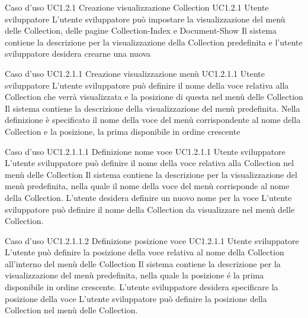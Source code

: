 \UCtitle
{Caso d'uso UC1.2.1}
{Creazione visualizzazione Collection}
\UC
{UC1.2.1}
{Utente sviluppatore}
{L'utente sviluppatore  può impostare la visualizzazione del menù delle Collection, delle pagine Collection-Index e Document-Show}
{Il sistema contiene la descrizione per la visualizzazione della Collection predefinita e l'utente sviluppatore desidera crearne una nuova}

\UCtitle
{Caso d'uso UC1.2.1.1}
{Creazione visualizzazione menù}
\UC
{UC1.2.1.1}
{Utente sviluppatore}
{L'utente sviluppatore può definire il nome della voce relativa alla Collection che verrà visualizzata e la posizione di questa nel menù delle Collection}
{Il sistema contiene la descrizione della visualizzazione del menù predefinita. Nella definizione è specificato il nome della voce del menù corrispondente al nome della Collection e la posizione, la prima disponibile in ordine crescente}

\UCtitle
{Caso d'uso UC1.2.1.1.1}
{Definizione nome voce}
\UC
{UC1.2.1.1}
{Utente sviluppatore}
{L'utente sviluppatore può definire il nome della voce relativa alla Collection nel menù delle Collection}
{Il sistema contiene la descrizione per la visualizzazione del menù predefinita, nella quale il nome della voce del menù corrisponde al nome della Collection. L'utente desidera definire un nuovo nome per la voce}
\scenario
{L'utente sviluppatore può definire il nome della Collection da visualizzare nel menù delle Collection.}

\UCtitle
{Caso d'uso UC1.2.1.1.2}
{Definizione posizione voce}
\UC
{UC1.2.1.1}
{Utente sviluppatore}
{L'utente può definire la posizione della voce relativa al nome della Collection all'interno del menù delle Collection}
{Il sistema contiene la descrizione per la visualizzazione del menù predefinita, nella quale la posizione \'e la prima disponibile in ordine crescente. L'utente sviluppatore desidera specificare la posizione della voce}
\scenario
{L'utente sviluppatore può definire la posizione della Collection nel menù delle Collection.}



